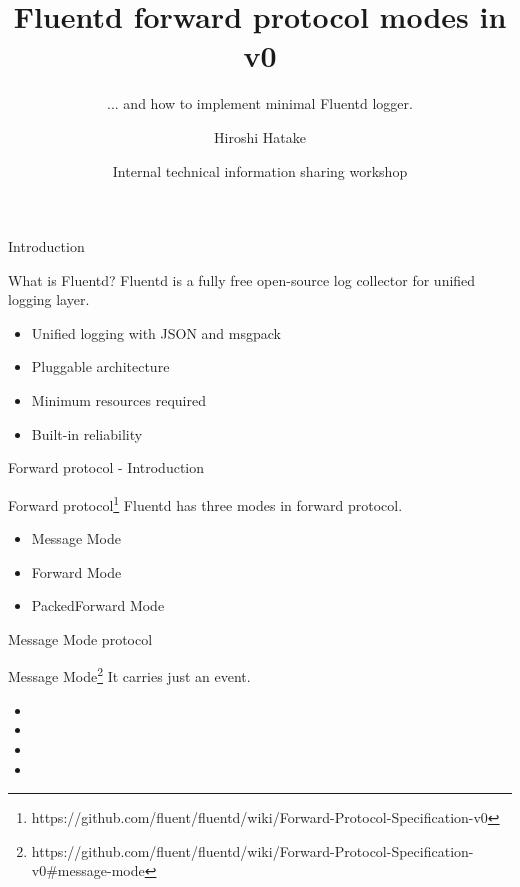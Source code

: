 \documentclass[12pt, unicode]{beamer}
\title{Fluentd forward protocol modes in v0}
\subtitle{... and how to implement minimal Fluentd logger.}
\author{Hiroshi Hatake}
\date[2016/04/08]{Internal technical information sharing workshop}
\begin{document}
\frame{\maketitle}

\begin{frame}{Introduction}
\begin{block}{What is Fluentd?}
Fluentd is a fully free open-source log collector for unified logging layer.
\end{block}
\begin{itemize}
\item<2-> Unified logging with JSON and msgpack
\item<3-> Pluggable architecture
\item<4-> Minimum resources required
\item<5-> Built-in reliability
\end{itemize}
\end{frame}

\begin{frame}{Forward protocol - Introduction}
\begin{block}{Forward protocol\footnote[frame]{https://github.com/fluent/fluentd/wiki/Forward-Protocol-Specification-v0}}
Fluentd has three modes in forward protocol.
\end{block}
\begin{itemize}
\item<1-> Message Mode
\item<2-> Forward Mode
\item<3-> PackedForward Mode
\end{itemize}
\end{frame}

\begin{frame}{Message Mode protocol}
\begin{block}{Message Mode\footnote[frame]{https://github.com/fluent/fluentd/wiki/Forward-Protocol-Specification-v0\#message-mode}}
It carries just an event.
\end{block}
\begin{itemize}
\item {}
\item {}
\item {}
\item {}
\end{itemize}
\end{frame}
\end{document}
